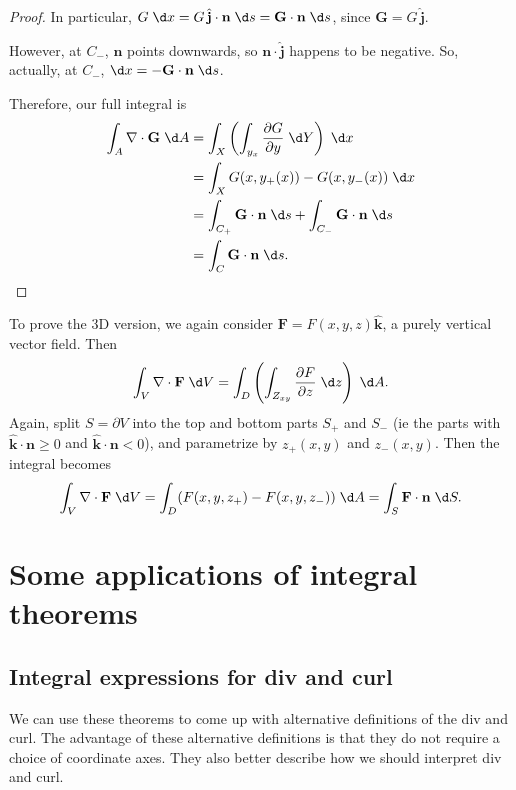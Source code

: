 \documentclass[a4paper]{article}
\begin{document}
\begin{proof}
  In particular, $G\;\d x = G\,\hat{\mathbf{j}}\cdot \mathbf{n}\;\d s = \mathbf{G}\cdot \mathbf{n}\;\d s$, since $\mathbf{G} = G\,\hat{\mathbf{j}}$.

  However, at $C_-$, $\mathbf{n}$ points downwards, so $\mathbf{n}\cdot \hat{\mathbf{j}}$ happens to be negative. So, actually, at $C_-$, $\d x = -\mathbf{G}\cdot \mathbf{n}\;\d s$.

  Therefore, our full integral is
  \begin{align*}
    \int_A \nabla\cdot \mathbf{G}\;\d A &= \int_X \left(\int_{y_x}\frac{\partial G}{\partial y}\;\d Y\right)\;\d x\\
    &= \int_X G(x, y_+(x)) - G(x, y_{-}(x))\;\d x\\
    &= \int_{C_+}\mathbf{G}\cdot \mathbf{n}\;\d s + \int_{C_-}\mathbf{G}\cdot \mathbf{n}\;\d s\\
    &= \int_C \mathbf{G}\cdot \mathbf{n}\;\d s.
  \end{align*}
\end{proof}

To prove the 3D version, we again consider $\mathbf{F} = F(x, y, z)\hat{\mathbf{k}}$, a purely vertical vector field. Then
\[
  \int_V \nabla\cdot \mathbf{F}\;\d V = \int_D \left(\int_{Z_{xy}} \frac{\partial F}{\partial z}\;\d z\right)\;\d A.
\]
Again, split $S = \partial V$ into the top and bottom parts $S_+$ and $S_-$ (ie the parts with $\hat{\mathbf{k}}\cdot \mathbf{n} \geq 0$ and $\hat{\mathbf{k}}\cdot \mathbf{n} < 0$), and parametrize by $z_+(x, y)$ and $z_-(x, y)$. Then the integral becomes
\[
  \int_V \nabla\cdot \mathbf{F}\;\d V = \int_D (F(x, y, z_+) - F(x, y, z_-))\;\d A = \int_S \mathbf{F}\cdot \mathbf{n}\;\d S.
\]
\section{Some applications of integral theorems}
\subsection{Integral expressions for div and curl}
We can use these theorems to come up with alternative definitions of the div and curl. The advantage of these alternative definitions is that they do not require a choice of coordinate axes. They also better describe how we should interpret div and curl.
\end{document}
